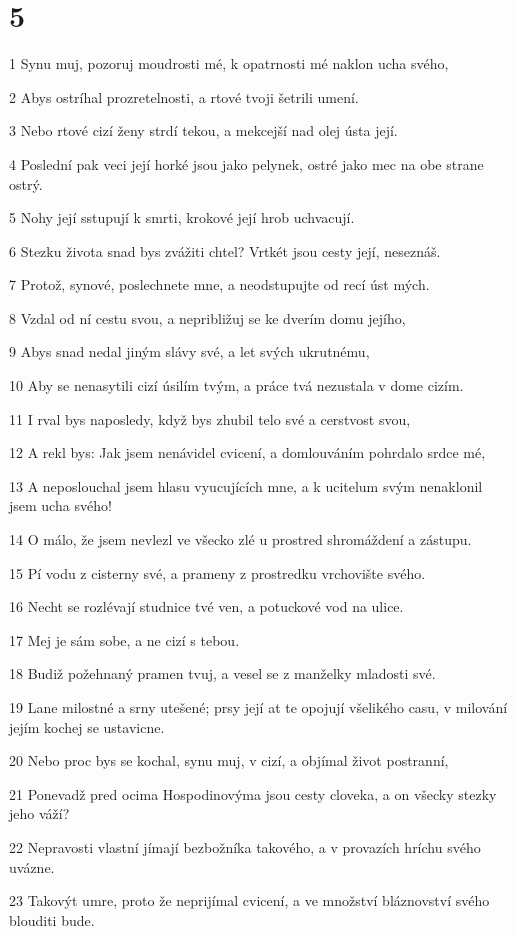 \chapter{5}

\par 1 Synu muj, pozoruj moudrosti mé, k opatrnosti mé naklon ucha svého,
\par 2 Abys ostríhal prozretelnosti, a rtové tvoji šetrili umení.
\par 3 Nebo rtové cizí ženy strdí tekou, a mekcejší nad olej ústa její.
\par 4 Poslední pak veci její horké jsou jako pelynek, ostré jako mec na obe strane ostrý.
\par 5 Nohy její sstupují k smrti, krokové její hrob uchvacují.
\par 6 Stezku života snad bys zvážiti chtel? Vrtkét jsou cesty její, neseznáš.
\par 7 Protož, synové, poslechnete mne, a neodstupujte od recí úst mých.
\par 8 Vzdal od ní cestu svou, a nepribližuj se ke dverím domu jejího,
\par 9 Abys snad nedal jiným slávy své, a let svých ukrutnému,
\par 10 Aby se nenasytili cizí úsilím tvým, a práce tvá nezustala v dome cizím.
\par 11 I rval bys naposledy, když bys zhubil telo své a cerstvost svou,
\par 12 A rekl bys: Jak jsem nenávidel cvicení, a domlouváním pohrdalo srdce mé,
\par 13 A neposlouchal jsem hlasu vyucujících mne, a k ucitelum svým nenaklonil jsem ucha svého!
\par 14 O málo, že jsem nevlezl ve všecko zlé u prostred shromáždení a zástupu.
\par 15 Pí vodu z cisterny své, a prameny z prostredku vrchovište svého.
\par 16 Necht se rozlévají studnice tvé ven, a potuckové vod na ulice.
\par 17 Mej je sám sobe, a ne cizí s tebou.
\par 18 Budiž požehnaný pramen tvuj, a vesel se z manželky mladosti své.
\par 19 Lane milostné a srny utešené; prsy její at te opojují všelikého casu, v milování jejím kochej se ustavicne.
\par 20 Nebo proc bys se kochal, synu muj, v cizí, a objímal život postranní,
\par 21 Ponevadž pred ocima Hospodinovýma jsou cesty cloveka, a on všecky stezky jeho váží?
\par 22 Nepravosti vlastní jímají bezbožníka takového, a v provazích hríchu svého uvázne.
\par 23 Takovýt umre, proto že neprijímal cvicení, a ve množství bláznovství svého blouditi bude.


